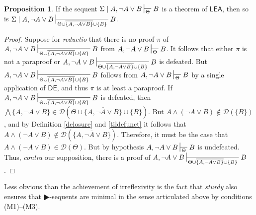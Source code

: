 \documentclass{article}
\theoremstyle{definition}
\theoremstyle{definition}
\theoremstyle{definition}
\theoremstyle{definition}
\theoremstyle{remark}
\theoremstyle{definition}
\newtheorem{proposition}{Proposition}
\theoremstyle{definition}
\begin{document}
\begin{proposition}
	If the sequent $ \Sigma\mid A, \neg A \vee B \sststile{\Theta}{}  B $ is a theorem of $ \mathsf{LEA}$, then so is $ \Sigma\mid A, \neg A \vee B \sststile{\Theta\cup\overline{\{ A, \neg A \vee B  \}}\cup\{B\}}{}  B $.
	
	\begin{proof}
		Suppose for \textit{reductio} that there is no proof $ \pi $ of $  A, \neg A \vee B \sststile{\Theta\cup\overline{\{ A, \neg A \vee B  \}}\cup\{B\}}{}  B $ from $ A, \neg A \vee B \sststile{\Theta}{}  B $. It follows that either $ \pi $ is not a paraproof or $ A, \neg A \vee B \sststile{\Theta\cup\overline{\{ A, \neg A \vee B  \}}\cup\{B\}}{}  B $ is defeated. But $  A, \neg A \vee B \sststile{\Theta\cup\overline{\{ A, \neg A \vee B  \}}\cup\{B\}}{}  B $ follows from $  A, \neg A \vee B \sststile{\Theta}{}  B $ by a single application of $ \mathsf{DE} $, and thus $ \pi $ is at least a paraproof. If $  A, \neg A \vee B \sststile{\Theta\cup\overline{\{ A, \neg A \vee B  \}}\cup\{B\}}{}  B $ is defeated, then $ \bigwedge \{A, \neg A \vee B\} \in \mathcal{D}(\Theta\cup\overline{\{ A, \neg A \vee B  \}}\cup\{B\})$. But  $ A \wedge (\neg A \vee B) \not\in \mathcal{D}(\{B\})$, and by Definition \ref{dclosure} and \ref{tildefunct} it follows that $ A \wedge (\neg A \vee B) \not\in \mathcal{D}(\overline{\{ A, \neg A \vee B  \}})$. Therefore, it must be the case that $ A \wedge (\neg A \vee B) \in\mathcal{D}(\Theta)$. But by hypothesis $  A, \neg A \vee B \sststile{\Theta}{}  B $ is undefeated. Thus, \textit{contra} our supposition, there is a proof of $ A, \neg A \vee B \sststile{\Theta\cup\overline{\{ A, \neg A \vee B  \}}\cup\{B\}}{}  B $.
	\end{proof}
\end{proposition}

\vspace{2mm}

Less obvious than the achievement of irreflexivity is the fact that \textit{sturdy} also ensures that $ \RHD$-sequents are minimal in the sense articulated above by conditions (M1)--(M3).

\end{document}
